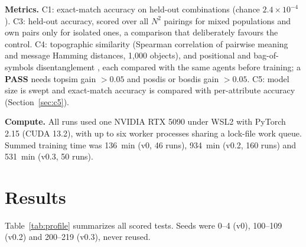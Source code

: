 \documentclass[11pt]{article}
\newcommand{\pass}{\textbf{PASS}}
\begin{document}
\textbf{Metrics.} C1: exact-match accuracy on held-out combinations (chance $2.4\times10^{-4}$).
C3: held-out accuracy, scored over all $N^2$ pairings for mixed populations and own pairs only
for isolated ones, a comparison that deliberately favours the control. C4: topographic
similarity (Spearman correlation of pairwise meaning and message Hamming distances, 1{,}000
objects), and positional and bag-of-symbols disentanglement \cite{chaabouni2020}, each compared
with the same agents before training; a \pass{} needs topsim gain $>0.05$ and posdis or bosdis
gain $>0.05$. C5: model size is swept and exact-match accuracy is compared with per-attribute
accuracy (Section~\ref{sec:c5}).

\textbf{Compute.} All runs used one NVIDIA RTX 5090 under WSL2 with PyTorch 2.15 (CUDA 13.2),
with up to six worker processes sharing a lock-file work queue. Summed training time was
136~min (v0, 46 runs), 934~min (v0.2, 160 runs) and 531~min (v0.3, 50 runs).

\section{Results}\label{sec:results}

Table~\ref{tab:profile} summarizes all scored tests. Seeds were 0--4 (v0), 100--109 (v0.2) and
200--219 (v0.3), never reused.
\end{document}
